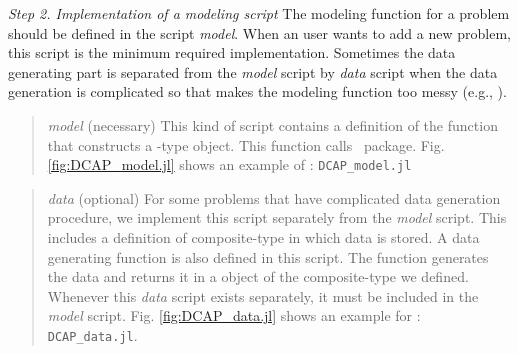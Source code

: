 \noindent\textit{Step 2. Implementation of a modeling script} The modeling function for a problem should be defined in the script \textit{model}. When an user wants to add a new problem, this script is the minimum required implementation. Sometimes the data generating part is separated from the \textit{model} script by \textit{data} script when the data generation is complicated so that makes the modeling function too messy (e.g., \suc).
\begin{quote}
	\noindent\textit{model} (necessary) This kind of script contains a definition of the function that constructs a \jumpmodel-type object. This function calls \structjump\ package. Fig. \ref{fig:DCAP_model.jl} shows an example of \dcap: \texttt{DCAP\_model.jl}
\end{quote}
\begin{quote}
	\noindent\textit{data} (optional) For some problems that have complicated data generation procedure, we implement this script separately from the \textit{model} script. This includes a definition of composite-type in which data is stored. A data generating function is also defined in this script. The function generates the data and returns it in a object of the composite-type we defined. Whenever this \textit{data} script exists separately, it must be included in the \textit{model} script. Fig. \ref{fig:DCAP_data.jl} shows an example for \dcap: \texttt{DCAP\_data.jl}.
\end{quote}

%
%		
%	


